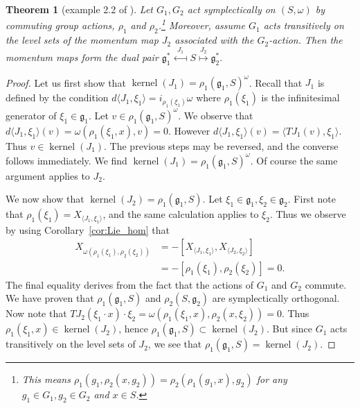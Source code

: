 \documentclass[12pt]{amsart}
\newtheorem{thm}{Theorem}[section]
\DeclareMathOperator{\kernel}{kernel}
\begin{document}
  \begin{thm}[example 2.2 of \cite{GayBalmazVizman2012}] \label{thm:commuting_actions}
    Let $G_1,G_2$ act symplectically on $(S,\omega)$
    by commuting group actions,
    $\rho_1$ and $\rho_2$.\footnote{
      This means 
      $\rho_1(g_1 , \rho_2 (x , g_2)) = \rho_2(\rho_1(g_1 , x) ,g_2)$
      for any $g_1 \in G_1, g_2 \in G_2$ and $x \in S$.}
    Moreover, assume $G_1$ acts transitively on the level sets of the momentum map $J_2$ associated with the  $G_2$-action.
    Then the momentum maps form the dual pair
    $
      \mathfrak{g}^*_1
      \stackrel{J_1}{\longmapsfrom}
      S
      \stackrel{J_2}{\longmapsto}
      \mathfrak{g}_2^*.
    $
  \end{thm}
  \begin{proof}
    Let us first show that $\kernel(J_1) = \rho_1(\mathfrak{g}_1 , S )^\omega$.
    Recall that $J_1$ is defined by the condition
    $d \langle J_1 , \xi_1 \rangle = i_{\rho_1(\xi_1)} \omega$
    where $\rho_1(\xi_1)$ is the infinitesimal generator of
    $\xi_1 \in \mathfrak{g}_1$.
    Let $v \in \rho_1(\mathfrak{g}_1,S)^\omega$.
    We observe that 
    $d \langle J_1 , \xi_1 \rangle (v) = \omega( \rho_1(\xi_1, x ), v ) = 0$.
    However $d\langle J_1 , \xi_1 \rangle (v) = \langle TJ_1(v) , \xi_1 \rangle$.
    Thus $v \in \kernel(J_1)$.
    The previous steps may be reversed, and
    the converse follows immediately.
    We find
    $\kernel(J_1) = \rho_1(\mathfrak{g}_1,S)^\omega$.
    Of course the same argument applies to $J_2$.

    We now show that $\kernel(J_2) = \rho_1(\mathfrak{g}_1,S)$.
    Let $\xi_1 \in \mathfrak{g}_1, \xi_2 \in \mathfrak{g}_2$.
    First note that $\rho_1(\xi_1) = X_{ \langle J_1 , \xi_1 \rangle}$,
    and the same calculation applies to $\xi_2$.
    Thus we observe by using Corollary~\ref{cor:Lie_hom} that
    \begin{align*}
      X_{ \omega( \rho_1(\xi_1) , \rho_2(\xi_2) ) }
      &= - [X_{ \langle J_1,\xi_1\rangle} , X_{\langle J_2,\xi_2\rangle} ] \\
      &= - [\rho_1(\xi_1) , \rho_2(\xi_2)] = 0.
    \end{align*}
    The final equality
    derives from the fact that the actions of $G_1$ and $G_2$ commute.
    We have proven that $\rho_1(\mathfrak{g}_1 , S)$ and $\rho_2(S,\mathfrak{g}_2)$ are
    symplectically orthogonal.
    Now note that
    $TJ_2 ( \xi_1 \cdot x) \cdot \xi_2 = \omega( \rho_1(\xi_1, x) ,\rho_2(x, \xi_2 )) = 0$.
    Thus $\rho_1(\xi_1 , x) \in \kernel( J_2)$, hence
    $\rho_1(\mathfrak{g}_1 ,S) \subset \kernel(J_2)$.
    But since $G_1$ acts transitively on the level sets of $J_2$, we see
    that $\rho_1(\mathfrak{g}_1, S) = \kernel( J_2)$.
  \end{proof}
\end{document}
